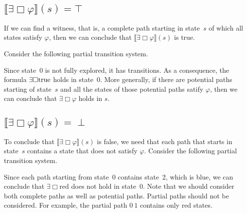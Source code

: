\documentclass[12pt]{article}
\newcommand{\always}{\Box}
\newcommand{\TRUE}{\mbox{\lstinline{true}}}
\theoremstyle{definition}
\newcommand{\satisfaction}[1]{\llbracket #1 \rrbracket}
\begin{document}

\subsection*{$\satisfaction{\exists \always \varphi}(s) = \top$}

If we can find a witness, that is, a complete path starting in state~$s$ of which all states satisfy $\varphi$, then we can conclude that $\satisfaction{\exists \always \varphi}(s)$ is true.

Consider the following partial transition system.
\begin{center}
\end{center}
Since state~0 is not fully explored, it has transitions.  As a consequence, the formula $\exists \always \TRUE$ holds in state~0.  More generally, if there are potential paths starting of state~$s$ and all the states of those potential paths satify $\varphi$, then we can conclude that $\exists \always \varphi$ holds in $s$.

\subsection*{$\satisfaction{\exists \always \varphi}(s) = \perp$}

To conclude that $\satisfaction{\exists \always \varphi}(s)$ is false, we need that each path that starts in state~$s$ contains a state that does not satisfy $\varphi$.  Consider the following partial transition system.
\begin{center}
\end{center}
Since each path starting from state~0 contains state~2, which is blue, we can conclude that $\exists \always \mbox{red}$ does not hold in state~0.  Note that we should consider both complete paths as well as potential paths.  Partial paths should not be considered.  For example, the partial path $0\ 1$ contains only red states.
\end{document}

